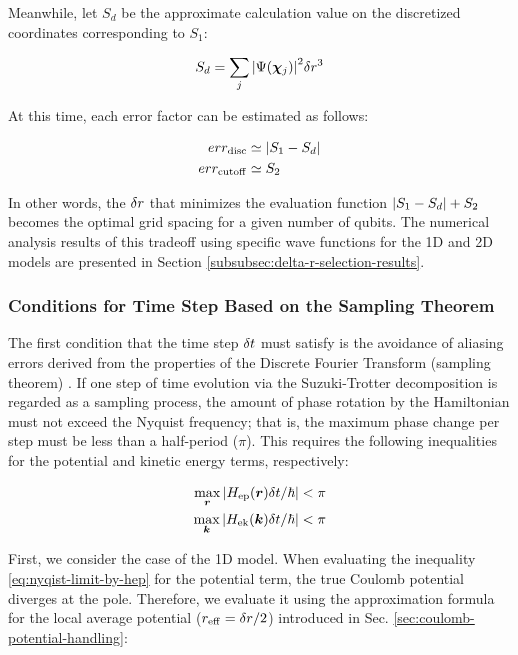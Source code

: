 \documentclass[report_2025.tex]{subfiles}
\begin{document}
Meanwhile, let $S_d$ be the approximate calculation value on the discretized
coordinates corresponding to $S_1$:

\begin{equation}
S_d = \sum_{j}{\left| \Psi(\bm{\chi}_{j}) \right|}^2 \delta r^3
\end{equation}

At this time, each error factor can be estimated as follows:

\begin{align}
err_{\mathrm{disc}} &\simeq {\left| S_1 - S_d \right|} \label{eq:err-disc-definition}\\
err_{\mathrm{cutoff}} &\simeq S_2 \label{eq:err-cutoff-definition}
\end{align}

In other words, the $\delta r$ that minimizes the evaluation function ${\left| S_1 -
S_d \right|} + S_2$ becomes the optimal grid spacing for a given number of qubits. The
numerical analysis results of this tradeoff using specific wave functions for
the 1D and 2D models are presented in Section
\ref{subsubsec:delta-r-selection-results}.

\subsubsection{Conditions for Time Step Based on the Sampling Theorem}

\label{subsubsec:deltat-selection-by-sampling-theorem}

The first condition that the time step $\delta t$ must satisfy is the avoidance
of aliasing errors derived from the properties of the Discrete Fourier Transform
(sampling theorem) \cite{FEIT1982412}. If one step of time evolution via the
Suzuki-Trotter decomposition is regarded as a sampling process, the amount of
phase rotation by the Hamiltonian must not exceed the Nyquist frequency; that
is, the maximum phase change per step must be less than a half-period ($\pi$).
This requires the following inequalities for the potential and kinetic energy
terms, respectively:

\begin{align}
\max_{\bm{r}}{\left| H_{\mathrm{ep}}(\bm{r})\delta t/\hbar \right|} < \pi \label{eq:nyqist-limit-by-hep}\\
\max_{\bm{k}}{\left| H_{\mathrm{ek}}(\bm{k})\delta t/\hbar \right|} < \pi \label{eq:nyqist-limit-by-hek}
\end{align}

First, we consider the case of the 1D model. When evaluating the inequality
\eqref{eq:nyqist-limit-by-hep} for the potential term, the true Coulomb
potential diverges at the pole. Therefore, we evaluate it using the
approximation formula for the local average potential ($r_{\mathrm{eff}}=\delta r/2$)
introduced in Sec. \ref{sec:coulomb-potential-handling}:
\end{document}
